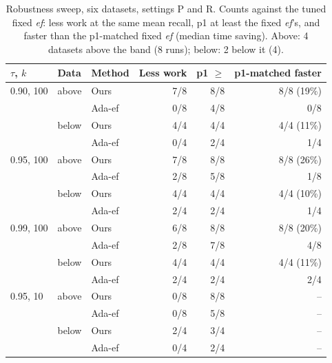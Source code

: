 \documentclass[sigconf,review=false,screen]{acmart}
\newcommand{\ef}{\textit{ef}}
\begin{document}
\begin{table}[t]
  \caption{Robustness sweep, six datasets, settings P and R. Counts against the tuned fixed \ef{}:
  less work at the same mean recall, p1 at least the fixed \ef{}'s, and faster than the p1-matched
  fixed \ef{} (median time saving). Above: 4 datasets above the band (8 runs); below: 2 below it (4).}
  \label{tab:sweep}
  \centering\footnotesize\setlength{\tabcolsep}{3.5pt}
  \begin{tabular}{lllrrr}
    \toprule
    $\tau$, $k$ & Data & Method & Less work & p1 $\geq$ & p1-matched faster \\
    \midrule
    0.90, 100 & above & Ours   & 7/8 & 8/8 & 8/8 (19\%) \\
              &       & Ada-ef & 0/8 & 4/8 & 0/8 \\
              & below & Ours   & 4/4 & 4/4 & 4/4 (11\%) \\
              &       & Ada-ef & 0/4 & 2/4 & 1/4 \\
    \midrule
    0.95, 100 & above & Ours   & 7/8 & 8/8 & 8/8 (26\%) \\
              &       & Ada-ef & 2/8 & 5/8 & 1/8 \\
              & below & Ours   & 4/4 & 4/4 & 4/4 (10\%) \\
              &       & Ada-ef & 2/4 & 2/4 & 1/4 \\
    \midrule
    0.99, 100 & above & Ours   & 6/8 & 8/8 & 8/8 (20\%) \\
              &       & Ada-ef & 2/8 & 7/8 & 4/8 \\
              & below & Ours   & 4/4 & 4/4 & 4/4 (11\%) \\
              &       & Ada-ef & 2/4 & 2/4 & 2/4 \\
    \midrule
    0.95, 10  & above & Ours   & 0/8 & 8/8 & -- \\
              &       & Ada-ef & 0/8 & 5/8 & -- \\
              & below & Ours   & 2/4 & 3/4 & -- \\
              &       & Ada-ef & 0/4 & 2/4 & -- \\
    \bottomrule
  \end{tabular}
\end{table}
\end{document}
